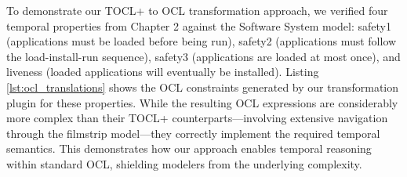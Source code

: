 To demonstrate our TOCL+ to OCL transformation approach, we verified four temporal 
properties from Chapter 2 against the Software System model: safety1 (applications 
must be loaded before being run), safety2 (applications must follow the 
load-install-run sequence), safety3 (applications are loaded at most once), and 
liveness (loaded applications will eventually be installed). Listing 
\ref{lst:ocl_translations} shows the OCL constraints generated by our transformation 
plugin for these properties. While the resulting OCL expressions are considerably 
more complex than their TOCL+ counterparts—involving extensive navigation through 
the filmstrip model—they correctly implement the required temporal semantics. This 
demonstrates how our approach enables temporal reasoning within standard OCL, 
shielding modelers from the underlying complexity.

